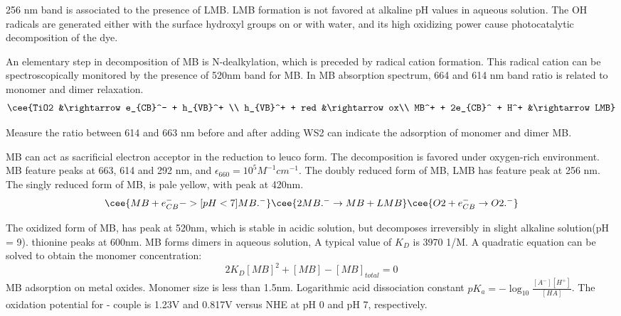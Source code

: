 256 nm band is associated to the presence of LMB. LMB formation is not favored at alkaline pH values in aqueous solution. The OH radicals are generated either with the surface hydroxyl groups on  or with water, and its high oxidizing power cause photocatalytic decomposition of the dye.

An elementary step in decomposition of MB is N-dealkylation, which is preceded by radical cation formation.\cite{Takizawa1978} This radical cation can be spectroscopically monitored by the presence of 520nm band for MB. In MB absorption spectrum, 664 and 614 nm band ratio is related to monomer and dimer relaxation.
\begin{align}
\cee{TiO2 &\rightarrow e_{CB}^- + h_{VB}^+ \\
h_{VB}^+ + red &\rightarrow ox\\
MB^+ + 2e_{CB}^ + H^+ &\rightarrow LMB}
\end{align}

Measure the ratio between 614 and 663 nm before and after adding WS2 can indicate the adsorption of monomer and dimer MB.

MB can act as sacrificial electron acceptor in the reduction to leuco form. The decomposition is favored under oxygen-rich environment. MB feature peaks at 663, 614 and 292 nm, and $\epsilon_{660}=10^5 M^{-1}cm^{-1}$. The doubly reduced form of MB, LMB has feature peak at 256 nm. The singly reduced form of MB,  is pale yellow, with peak at 420nm.\cite{Mills1999}
\[
\cee{MB + e_{CB}^- ->[pH<7] MB.^-}
\cee{2MB.^- \rightarrow MB + LMB}
\cee{O2 + e_{CB}^- \rightarrow O2.^-}
\]

The oxidized form of MB,  has peak at 520nm, which is stable in acidic solution, but decomposes irreversibly in slight alkaline solution(pH = 9).
thionine peaks at 600nm.
MB forms dimers in aqueous solution,
A typical value of $K_D$ is 3970 1/M. A quadratic equation can be solved to obtain the monomer concentration:
\[
2K_D [MB]^2 + [MB] - [MB]_{total} = 0
\]
MB adsorption on metal oxides. Monomer size is less than 1.5nm.
Logarithmic acid dissociation constant $pK_a= -\log_10 \frac{[A^-][H^+]}{[HA]}$. The oxidation potential for - couple is 1.23V and 0.817V versus NHE at pH 0 and pH 7, respectively.



